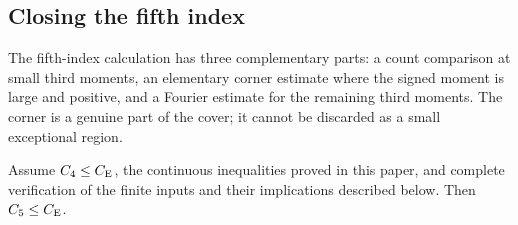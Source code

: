 \subsection{Closing the fifth index}
\label{ext:five-assembly}
The fifth-index calculation has three complementary parts: a count
comparison at small third moments, an elementary corner estimate where
the signed moment is large and positive, and a Fourier estimate for the
remaining third moments. The corner is a genuine part of the cover;
it cannot be discarded as a small exceptional region.

\begin{proposition}
\label{ext:five-assembly-criterion}
Assume $C_4\le C_{\mathrm E}$, the continuous inequalities proved in this paper,
and complete verification of the finite inputs and their implications
described below. Then $C_5\le C_{\mathrm E}$.
\end{proposition}
